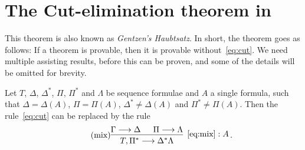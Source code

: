 \documentclass[11pt,a4paper]{article}
\begin{document}
\section{The Cut-elimination theorem in \LK}

This theorem is also known as \emph{Gentzen's Haubtsatz}.
In short, the theorem goes as follows: If a theorem is provable,
then it is provable without~\eqref{eq:cut}.
We need multiple assisting results,
before this can be proven,
and some of the details will be omitted for brevity.

\begin{lemma}\label{lem:mix rule}
    Let \(T\), \(\Delta\), \(\Delta^\ast\), \(\Pi\), \(\Pi^\ast\) and \(\Lambda\) be sequence formulae
    and \(A\) a single formula, such that \(\Delta = \Delta(A)\), \(\Pi = \Pi(A)\),
    \(\Delta^\ast\neq\Delta(A)\) and \(\Pi^\ast\neq\Pi(A)\). Then the rule~\eqref{eq:cut}
    can be replaced by the rule
    \begin{equation}\label{eq:mix}\tag{mix}
        \begin{prooftree}
            \hypo{\Gamma\seq\Delta}
            \hypo{\Pi\seq\Lambda}
            \infer2[\(\eqref{eq:mix}:A\)]{T,\Pi^\ast\seq\Delta^\ast\Lambda}
        \end{prooftree}\,.
    \end{equation}
\end{lemma}
\end{document}

